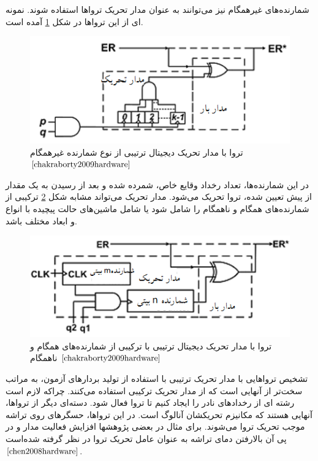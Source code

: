 شمارنده‌های غیرهمگام نیز می‌توانند به عنوان مدار تحریک تروا‌ها استفاده شوند. نمونه ای از این تروا‌ها در شکل \ref{fig3-3} آمده است.
\begin{figure}
	\begin{center}
		\includegraphics[scale=1]{figs/fig3-3.png}
		\caption[تروا با مدار تحریک دیجیتال ترتیبی از نوع شمارنده غیرهمگام]
		{تروا با مدار تحریک دیجیتال ترتیبی از نوع شمارنده غیرهمگام $\cite{chakraborty2009hardware}$}
		\label{fig3-3}
	\end{center}
\end{figure}

در این شمارنده‌ها، تعداد رخداد وقایع خاص، شمرده شده و بعد از رسیدن به یک مقدار از پیش تعیین شده، تروا تحریک می‌شود. مدار تحریک می‌تواند مشابه شکل \ref{fig4-3} ترکیبی از شمارنده‌های همگام و ناهمگام را شامل شود یا شامل ماشین‌ها‌‌ی حالت پیچیده با انواع و ابعاد مختلف باشد.
\begin{figure}
	\begin{center}
		\includegraphics[scale=1]{figs/fig4-3.png}
		\caption[تروا با مدار تحریک دیجیتال ترتیبی با ترکیبی از شمارنده‌های همگام و ناهمگام ]
		{تروا با مدار تحریک دیجیتال ترتیبی با ترکیبی از شمارنده‌های همگام و ناهمگام $\cite{chakraborty2009hardware}$}
		\label{fig4-3}
	\end{center}
\end{figure}

تشخیص تروا‌هایی با مدار تحریک ترتیبی با استفاده از تولید بردارهای آزمون، به مراتب سخت‌تر از آنهایی است که از مدار تحریک ترکیبی استفاده می‌کنند. چراکه لازم است رشته ای از رخدادهای نادر را ایجاد کنیم تا تروا فعال شود.
دسته‌ای دیگر از تروا‌ها، آنهایی هستند که مکانیزم تحریکشان آنالوگ است. در این تروا‌ها، حسگرهای روی تراشه موجب تحریک تروا می‌شوند.  برای مثال در بعضی پژوهشها افزایش فعالیت مدار و در پی آن بالارفتن دمای تراشه به عنوان عامل تحریک تروا در نظر گرفته شده‌است $\cite{chen2008hardware}$.

